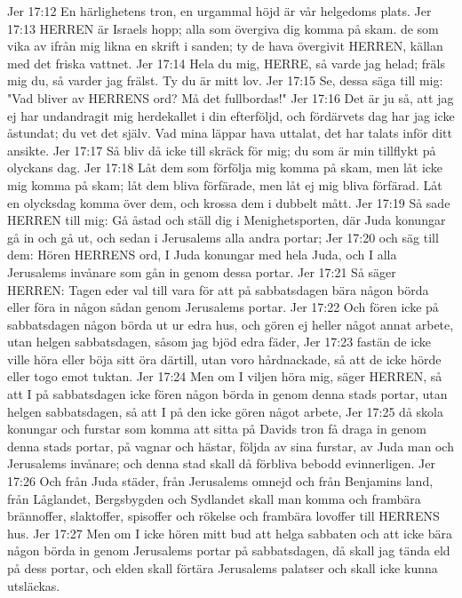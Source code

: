 Jer 17:12  En härlighetens tron, en urgammal höjd är vår helgedoms plats.
Jer 17:13  HERREN är Israels hopp; alla som övergiva dig komma på skam. de som vika av ifrån mig likna en skrift i sanden; ty de hava övergivit HERREN, källan med det friska vattnet.
Jer 17:14  Hela du mig, HERRE, så varde jag helad; fräls mig du, så varder jag frälst. Ty du är mitt lov.
Jer 17:15  Se, dessa säga till mig: "Vad bliver av HERRENS ord? Må det fullbordas!"
Jer 17:16  Det är ju så, att jag ej har undandragit mig herdekallet i din efterföljd, och fördärvets dag har jag icke åstundat; du vet det själv. Vad mina läppar hava uttalat, det har talats inför ditt ansikte.
Jer 17:17  Så bliv då icke till skräck för mig; du som är min tillflykt på olyckans dag.
Jer 17:18  Låt dem som förfölja mig komma på skam, men låt icke mig komma på skam; låt dem bliva förfärade, men låt ej mig bliva förfärad. Låt en olycksdag komma över dem, och krossa dem i dubbelt mått.
Jer 17:19  Så sade HERREN till mig: Gå åstad och ställ dig i Menighetsporten, där Juda konungar gå in och gå ut, och sedan i Jerusalems alla andra portar;
Jer 17:20  och säg till dem: Hören HERRENS ord, I Juda konungar med hela Juda, och I alla Jerusalems invånare som gån in genom dessa portar.
Jer 17:21  Så säger HERREN: Tagen eder val till vara för att på sabbatsdagen bära någon börda eller föra in någon sådan genom Jerusalems portar.
Jer 17:22  Och fören icke på sabbatsdagen någon börda ut ur edra hus, och gören ej heller något annat arbete, utan helgen sabbatsdagen, såsom jag bjöd edra fäder,
Jer 17:23  fastän de icke ville höra eller böja sitt öra därtill, utan voro hårdnackade, så att de icke hörde eller togo emot tuktan.
Jer 17:24  Men om I viljen höra mig, säger HERREN, så att I på sabbatsdagen icke fören någon börda in genom denna stads portar, utan helgen sabbatsdagen, så att I på den icke gören något arbete,
Jer 17:25  då skola konungar och furstar som komma att sitta på Davids tron få draga in genom denna stads portar, på vagnar och hästar, följda av sina furstar, av Juda man och Jerusalems invånare; och denna stad skall då förbliva bebodd evinnerligen.
Jer 17:26  Och från Juda städer, från Jerusalems omnejd och från Benjamins land, från Låglandet, Bergsbygden och Sydlandet skall man komma och frambära brännoffer, slaktoffer, spisoffer och rökelse och frambära lovoffer till HERRENS hus.
Jer 17:27  Men om I icke hören mitt bud att helga sabbaten och att icke bära någon börda in genom Jerusalems portar på sabbatsdagen, då skall jag tända eld på dess portar, och elden skall förtära Jerusalems palatser och skall icke kunna utsläckas.
